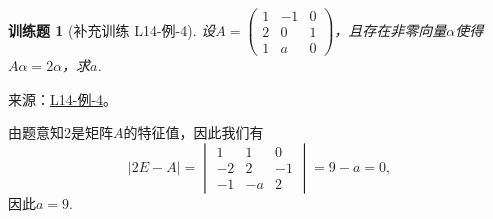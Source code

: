 \documentclass[UTF8,12pt,a4paper,fontset=fandol]{ctexart}
\newtheorem{exercise}{训练题}[section]
\begin{document}
\begin{exercise}[补充训练 L14-例-4]\label{prob:L14-例-4}
设$A=\begin{pmatrix}
            1 & -1 & 0 \\ 2 & 0 & 1 \\ 1 & a & 0
        \end{pmatrix}$，且存在非零向量$\alpha$使得$A\alpha=2\alpha$，求$a$.
\end{exercise}
\noindent 来源：\href{https://github.com/yhwu-is/Linear-Algebra-Left-Undone/blob/new/%E8%AE%B2%E4%B9%89/%E4%B8%93%E9%A2%98/14%20%E7%9B%B8%E4%BC%BC%E6%A0%87%E5%87%86%E5%BD%A2%EF%BC%9A%E5%8A%A8%E6%9C%BA%E4%B8%8E%E5%9F%BA%E7%A1%80.tex}{L14-例-4}。
\begin{solve}
由题意知2是矩阵$A$的特征值，因此我们有
    \[|2E-A|=\begin{vmatrix}
            1 & 1 & 0 \\ -2 & 2 & -1 \\ -1 & -a & 2
        \end{vmatrix}=9-a=0,\]
    因此$a=9$.
\end{solve}
\end{document}
